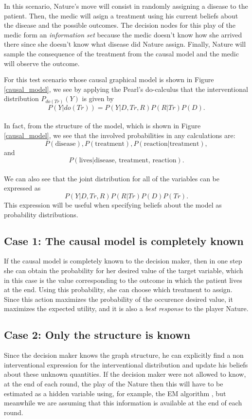 \documentclass[english,letterpaper,12pt,final]{article}
\theoremstyle{definition}
\begin{document}
In this scenario, Nature's move will consist in randomly assigning a disease to the patient. Then, the medic will asign a treatment using his current beliefs about the disease and the possible outcomes. The decision nodes for this play of the medic form an \textit{information set} because the medic doesn't know how she arrived there since she doesn't know what disease did Nature assign. Finally, Nature will sample the consequence of the treatment from the causal model and the medic will observe the outcome.

For this test scenario whose causal graphical model is shown in Figure \ref{causal_model}, we see  by applying the Pearl's do-calculus that the interventional distribution $P_{do(Tr)}(Y)$ is given by
\[ P(Y | do(Tr))=P(Y | D, Tr, R)P(R | Tr) P(D). \]
\\
In fact, from the structure of the model, which is shown in Figure \ref{causal_model}, we see that the involved probabilities in any calculations are:
\[ P(\textrm{disease}), P(\textrm{treatment}), P(\textrm{reaction} | \textrm{treatment}), \]
and
\[P(\textrm{lives} | \textrm{disease, treatment, reaction}). \]
\\
We can also see that the joint distribution for all of the variables can be expressed as
\[ P(Y | D, Tr, R)P(R | Tr) P(D)P(Tr). \]
This expression will be useful when specifying beliefs about the model as probability distributions.

\subsection{Case 1: The causal model is completely known}
If the causal model is completely known to the decision maker, then in one step she can obtain the probability for her desired value of the target variable, which in this case is the value corresponding to the outcome in which the patient lives at the end. Using this probability, she can choose which treatment to assign. Since this action maximizes the probability of the occurence desired value, it maximizes the expected utility, and it is also a \textit{best response} to the player Nature.

\subsection{Case 2: Only the structure is known}
Since the decision maker knows the graph structure, he can explicitly find a non interventional expression for the interventional distribution and update his beliefs about these unknown quantities. If the decision maker were not allowed to know, at the end of each round, the play of the Nature then this will have to be estimated as a hidden variable using, for example, the EM algorithm \cite{dempster1977maximum}, but meanwhile we are assuming that this information is available at the end of each round.
\end{document}
